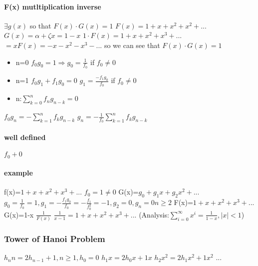 \documentclass[a4paper,10pt]{article}
\begin{document}
\paragraph{F(x) mutltiplication inverse}
$\exists g(x)$ so that $F(x)\cdot G(x)=1$
\newline
$F(x)=1+x+x^2+x^2+...$
\newline
$G(x)=\alpha+\zeta x=1-x$
\newline
$1\cdot F(x)=1+x+x^2+x^3+...$
\newline
$=xF(x)=-x-x^2-x^3-...$
\newline
so we can see that $F(x)\cdot G(x)=1$
\newline
\begin{itemize}
 \item n=0 $f_0g_0=1\Rightarrow g_0=\frac{1}{f_0}$ if $f_0\neq0$
 \item n=1 $f_0g_1+f_1g_0=0$ $g_1=\frac{-f_1g_0}{f_0}$ if $f_0\neq 0$
 \item n:$\sum_{k=0}^nf_ng_{n-k}=0$
\end{itemize}
$f_0g_n=-\sum_{k=1}^nf_kg_{n-k}$
\newline
$g_n=-\frac{1}{f_0}\sum_{k=1}^nf_kg_{n-k}$
\paragraph{well defined}
$f_0+0$
\paragraph{example}
f(x)=$1+x+x^2+x^3+...$
\newline
$f_0=1\neq 0$
\newline
G(x)=$g_0+g_1x+g_2x^2+...$
\newline
$g_0=\frac{1}{f_0}=1,g_1=-\frac{f_1g_0}{f_0}=-\frac{f_1}{f_0^2}=-1,g_2=0,g_n=0 n\geq 2$
\newline
F(x)=$1+x+x^2+x^3+...$
\newline
G(x)=1-x
\newline
$\frac{1}{F(x)}$
\newline
$\frac{1}{x-1}=1+x+x^2+x^3+...$
\newline
(Analysis:$\sum_{i=0}^{\infty}x^i=\frac{1}{1-x},|x|<1$)
\subsubsection{Tower of Hanoi Problem}
$h_nn=2h_{n-1}+1, n\geq 1,h_0=0$
\newline
$h_1x=2h_0x+1x$
\newline
$h_2x^2=2h_1x^2+1x^2$
\newline
...
\end{document}
